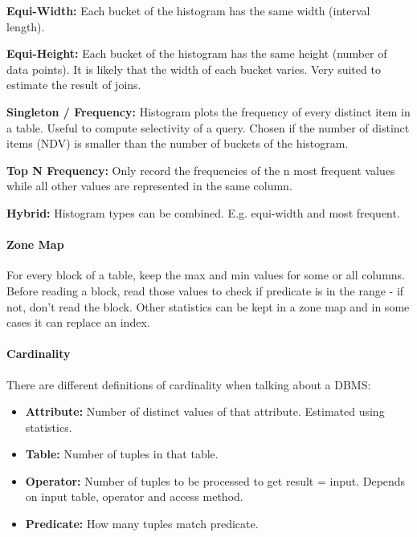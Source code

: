 \textbf{Equi-Width:} Each bucket of the histogram has the same width (interval length).

\textbf{Equi-Height:} Each bucket of the histogram has the same height (number of data points). It is likely that the width of each bucket varies. Very suited to estimate the result of joins.

\textbf{Singleton / Frequency:} Histogram plots the frequency of every distinct item in a table. Useful to compute selectivity of a query. Chosen if the number of distinct items (NDV) is smaller than the number of buckets of the histogram.

\textbf{Top N Frequency:} Only record the frequencies of the n most frequent values while all other values are represented in the same column.

\textbf{Hybrid:} Histogram types can be combined. E.g. equi-width and most frequent.

\paragraph{Zone Map}
For every block of a table, keep the max and min values for some or all columns. Before reading a block, read those values to check if predicate is in the range - if not, don't read the block. Other statistics can be kept in a zone map and in some cases it can replace an index.

\paragraph{Cardinality}
There are different definitions of cardinality when talking about a DBMS:
\begin{itemize}
    \item \textbf{Attribute:} Number of distinct values of that attribute. Estimated using statistics.
    \item \textbf{Table:} Number of tuples in that table.
    \item \textbf{Operator:} Number of tuples to be processed to get result = input. Depends on input table, operator and access method.
    \item \textbf{Predicate:} How many tuples match predicate.
\end{itemize}

